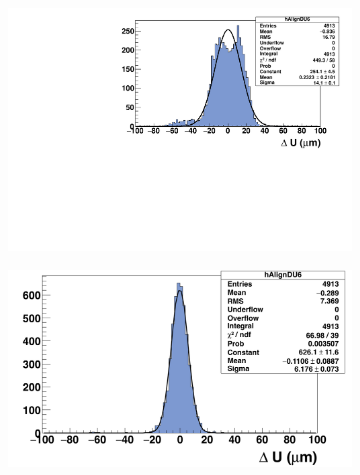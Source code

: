 \begin{figure}[!h]
    \begin{subfigure}[t]{0.45\textwidth}
      \centering
      \includegraphics[width = \textwidth]{Pictures/deformation/deltaU_6_deformed.pdf}
      \caption{}
      \label{fig:scatterDU_deformed_back_resume}
    \end{subfigure}
    \hfill
    \begin{subfigure}[t]{0.45\textwidth}
      \centering
      \includegraphics[width = \textwidth]{Pictures/deformation/deltaU_6_corrected1.png}
      \caption{}
      \label{fig:residualU_corrected_back_resume}
    \end{subfigure}

\end{figure}
